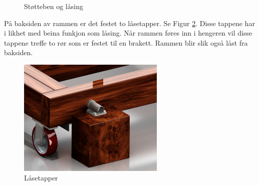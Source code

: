 \begin{figure}[h!]
\centering   
{}
\qquad
{}
\caption{Støtteben og låsing}
\label{F5}
\end{figure}

På baksiden av rammen er det festet to låsetapper. Se Figur \ref{F6}. Disse tappene har i likhet med beina funkjon som låsing. Når rammen føres inn i hengeren vil disse tappene treffe to rør som er festet til en brakett. Rammen blir slik også låst fra baksiden.  

\begin{figure}[h!]
\centerline{\includegraphics [width=7cm]{images/8.png}}
\caption{Låsetapper}
\label{F6}
\end{figure}
